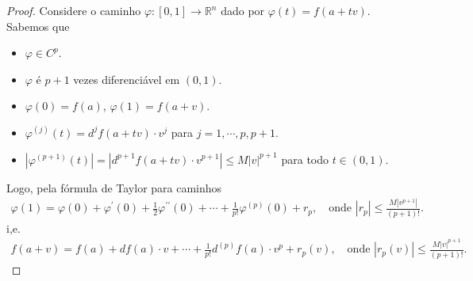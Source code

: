 \begin{proof} 
  Considere o caminho $\varphi:[0,1]\to\mathbb{R}^{n}$ dado por $\varphi(t)=f(a+tv)$.\\
  Sabemos que
  \begin{itemize}
    \item $\varphi\in C^{p}$.
    \item $\varphi$ é $p+1$ vezes diferenciável em $(0,1)$.
    \item $\varphi(0)=f(a)$, $\varphi(1)=f(a+v)$.
    \item $\varphi^{(j)}(t)=d^{j}f(a+tv)\cdot v^{j}$ para $j=1,\cdots,p,p+1$.
    \item $|\varphi^{(p+1)}(t)|=|d^{p+1}f(a+tv)\cdot v^{p+1}|\leq M|v|^{p+1}$ para todo $t\in(0,1)$. 
  \end{itemize}
  Logo, pela fórmula de Taylor para caminhos
  \begin{align*}
    \varphi(1)=\varphi(0)+\varphi^{\prime}(0)+\frac{1}{2}\varphi^{\prime\prime}(0)+\cdots+\frac{1}{p!}\varphi^{(p)}(0)+r_p,\quad\text{onde }|r_p|\leq\frac{M|v^{p+1}|}{(p+1)!}.
  \end{align*}
  i,e.
  \begin{align*}
    f(a+v)=f(a)+df(a)\cdot v+\cdots+\frac{1}{p!}d^{(p)}f(a)\cdot v^{p}+r_p(v),\quad\text{onde }|r_p(v)|\leq \frac{M|v|^{p+1}}{(p+1)!}.
  \end{align*}
\end{proof}
